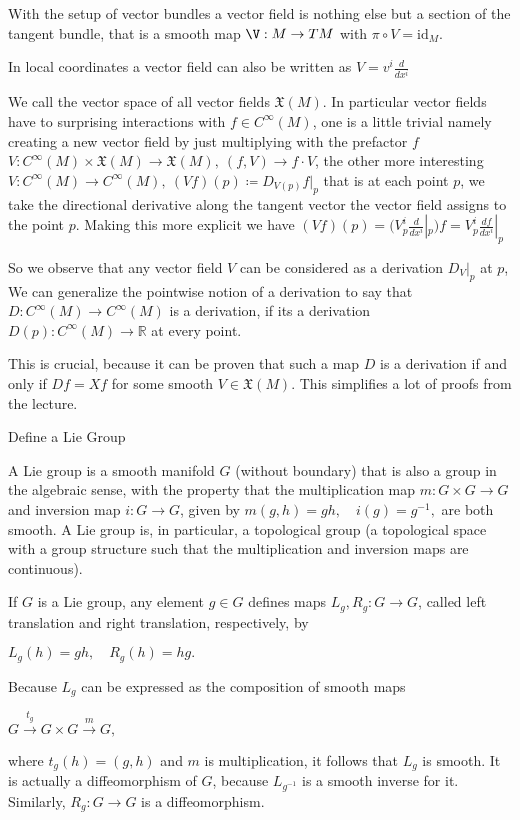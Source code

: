 With the setup of vector bundles a vector field is nothing else but a section 
of the tangent bundle, that is a smooth map \( \V : M \to TM \)
with \( \pi \circ V = \text{id}_{M} \).

In local coordinates a vector field can also be written as
\( V = v^i\frac{d}{dx^i} \)

We call the vector space of all vector fields \( \mathfrak{X}(M) \).
In particular vector fields have to surprising interactions with \( f \in C^\infty(M) \),
one is a little trivial namely creating a new vector field by just multiplying with the prefactor \( f \)
\( V : C^\infty(M) \times \mathfrak{X}(M) \to \mathfrak{X}(M), \ (f, V) \to f \cdot V \),
the other more interesting
\( V : C^\infty(M) \to C^\infty(M),\ (Vf)(p) \coloneqq D_{V(p)}f|_{p} \)
that is at each point \( p \), we take the directional derivative along the tangent vector
the vector field assigns to the point \( p \).
Making this more explicit we have
\( (Vf)(p) = (V^i_p \frac{d}{dx^i}|_{p})f = V^i_p \frac{df}{dx^i}|_{p}\)

So we observe that any vector field \( V \) can be considered as a derivation \( D_{V}|_{p} \) at \( p \),
We can generalize the pointwise notion of a derivation to say that \( D : C^\infty(M) \to C^\infty(M) \)
is a derivation, if its a derivation \( D(p) : C^\infty(M) \to \mathbb{R} \) at every point.

This is crucial, because it can be proven that such a map \( D \) is a derivation if and only if
\( Df = Xf \) for some smooth \( V \in \mathfrak{X}(M) \). This simplifies a lot of proofs from the lecture.

Define a Lie Group

A Lie group is a smooth manifold \( G \) (without boundary) that is also a group in the algebraic sense, 
with the property that the multiplication map \( m : G \times G \to G \) and inversion map \( i : G \to G \), given by
\(
m(g, h) = gh, \quad i(g) = g^{-1},
\)
are both smooth. 
A Lie group is, in particular, a topological group 
(a topological space with a group structure such that the multiplication and inversion maps are continuous).

If \(G\) is a Lie group, any element \(g \in G\) defines maps \(L_g, R_g: G \to G\), called left translation and right translation, respectively, by 

\(L_g(h) = gh, \quad R_g(h) = hg.\)

Because \(L_g\) can be expressed as the composition of smooth maps 

\(G \xrightarrow{t_g} G \times G \xrightarrow{m} G,\)

where \(t_g(h) = (g,h)\) and \(m\) is multiplication, it follows that \(L_g\) is smooth. 
It is actually a diffeomorphism of \(G\), because \(L_{g^{-1}}\) is a smooth inverse for it. 
Similarly, \(R_g: G \to G\) is a diffeomorphism. 
